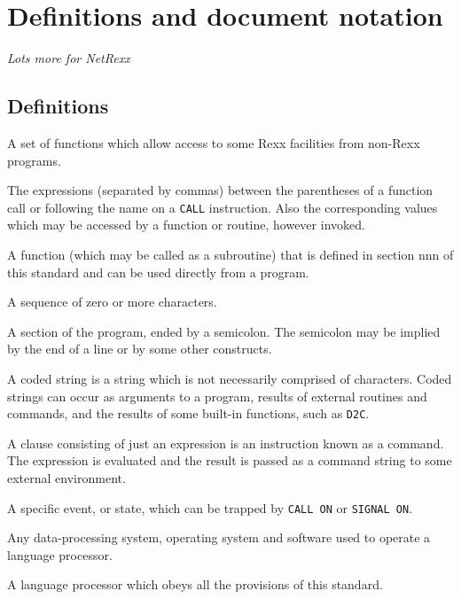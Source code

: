 \chapter{Definitions and document
notation}\label{definitions-and-document-notation}

\emph{Lots more for NetRexx}

\section{Definitions}\label{definitions}

\begin{description}
\tightlist
\item[application programming interface]
A set of functions which allow access to some Rexx facilities from
non-Rexx programs.
\item[arguments]
The expressions (separated by commas) between the parentheses of a
function call or following the name on a \texttt{CALL} instruction. Also
the corresponding values which may be accessed by a function or routine,
however invoked.
\item[built-in function]
A function (which may be called as a subroutine) that is defined in
section nnn of this standard and can be used directly from a program.
\item[character string]
A sequence of zero or more characters.
\item[clause]
A section of the program, ended by a semicolon. The semicolon may be
implied by the end of a line or by some other constructs.
\item[coded]
A coded string is a string which is not necessarily comprised of
characters. Coded strings can occur as arguments to a program, results
of external routines and commands, and the results of some built-in
functions, such as \texttt{D2C}.
\item[command]
A clause consisting of just an expression is an instruction known as a
command. The expression is evaluated and the result is passed as a
command string to some external environment.
\item[condition]
A specific event, or state, which can be trapped by \texttt{CALL\ ON} or
\texttt{SIGNAL\ ON}.
\item[configuration]
Any data-processing system, operating system and software used to
operate a language processor.
\item[conforming language processor]
A language processor which obeys all the provisions of this standard.

\end{description}
